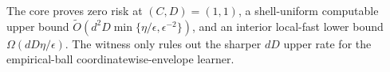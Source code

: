The core proves zero risk at \((C,D)=(1,1)\), a shell-uniform computable upper bound \(\widetilde O(d^2D\min\{\eta/\epsilon,\epsilon^{-2}\})\), and an interior local-fast lower bound \(\Omega(dD\eta/\epsilon)\). The witness only rules out the sharper \(dD\) upper rate for the empirical-ball coordinatewise-envelope learner.